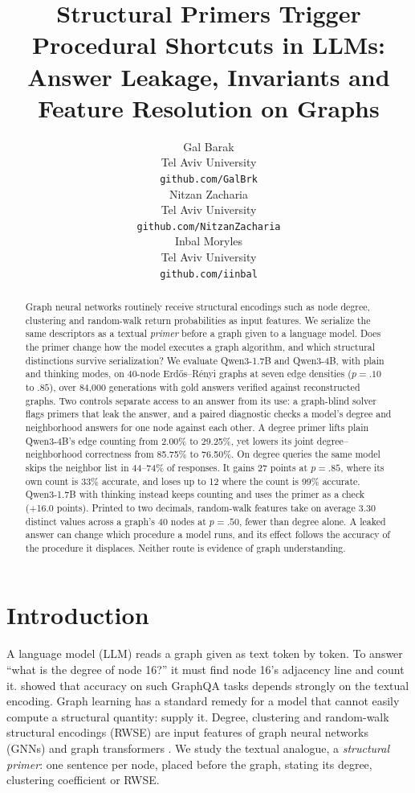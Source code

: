 \documentclass[11pt]{article}
\title{Structural Primers Trigger Procedural Shortcuts in LLMs:\\
Answer Leakage, Invariants and Feature Resolution on Graphs}
\author{
  Gal Barak \\
  Tel Aviv University \\
  \footnotesize\texttt{github.com/GalBrk} \\\And
  Nitzan Zacharia \\
  Tel Aviv University \\
  \footnotesize\texttt{github.com/NitzanZacharia} \\\And
  Inbal Moryles \\
  Tel Aviv University \\
  \footnotesize\texttt{github.com/iinbal} \\
}
\begin{document}
\maketitle
\raggedbottom

\begin{abstract}
Graph neural networks routinely receive structural encodings such as node
degree, clustering and random-walk return probabilities as input features.
We serialize the same descriptors as a textual \emph{primer} before a graph
given to a language model. Does the primer change how the model executes a
graph algorithm, and which structural distinctions survive serialization? We evaluate Qwen3-1.7B and Qwen3-4B,
with plain and thinking modes, on 40-node Erd\H{o}s--R\'enyi graphs at seven
edge densities ($p{=}.10$ to $.85$), over 84,000 generations with gold
answers verified against reconstructed graphs. Two controls separate access to an answer from its use: a graph-blind
solver flags primers that leak the answer, and a paired diagnostic checks
a model's degree and neighborhood answers for one node against each other. A degree primer lifts plain
Qwen3-4B's edge counting from 2.00\% to 29.25\%, yet lowers its joint
degree--neighborhood correctness from 85.75\% to 76.50\%. On degree queries
the same model skips the neighbor list in 44--74\% of responses. It gains
27 points at $p{=}.85$, where its own count is 33\% accurate, and loses up
to 12 where the count is 99\% accurate. Qwen3-1.7B with thinking instead
keeps counting and uses the primer as a check (+16.0 points). Printed to two
decimals, random-walk features take on average 3.30 distinct values across a
graph's 40 nodes at $p{=}.50$, fewer than degree alone. A leaked answer can
change which procedure a model runs, and its effect follows the accuracy of
the procedure it displaces. Neither route is evidence of graph
understanding.
\end{abstract}

\section{Introduction}

A language model (LLM) reads a graph given as text token by token. To
answer ``what is the degree of node 16?'' it must find node 16's adjacency
line and count it. \citet{fatemi2023talklikeagraph} showed that accuracy on
such GraphQA tasks depends strongly on the textual encoding. Graph learning
has a standard remedy for a model that cannot easily compute a structural
quantity: supply it. Degree, clustering and random-walk structural encodings
(RWSE) are input features of graph neural networks (GNNs) and graph
transformers \citep{dwivedi2022graph,rampasek2022recipe}. We study the
textual analogue, a \emph{structural primer}: one sentence per node, placed
before the graph, stating its degree, clustering coefficient or RWSE.
\end{document}
